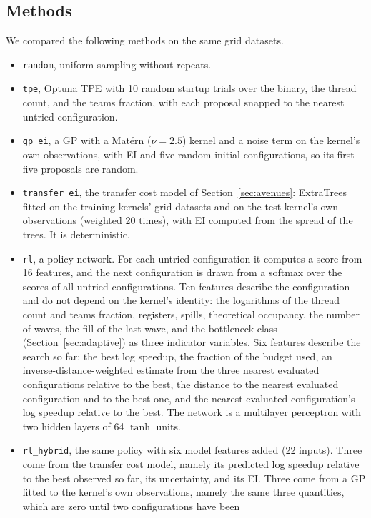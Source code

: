 \documentclass[10pt]{article}
\newcommand{\code}[1]{\texttt{#1}}
\begin{document}
\subsection{Methods}
We compared the following methods on the same grid datasets.
\begin{itemize}
\item \code{random}, uniform sampling without repeats.
\item \code{tpe}, Optuna TPE with 10 random startup trials over the binary,
  the thread count, and the teams fraction, with each proposal snapped to the
  nearest untried configuration.
\item \code{gp\_ei}, a GP with a Mat\'ern ($\nu = 2.5$) kernel and a noise
  term on the kernel's own observations, with EI and five random initial
  configurations, so its first five proposals are random.
\item \code{transfer\_ei}, the transfer cost model of
  Section~\ref{sec:avenues}: ExtraTrees fitted on the training kernels'
  grid datasets and on the test kernel's own observations (weighted 20 times),
  with EI computed from the spread of the trees. It is deterministic.
\item \code{rl}, a policy network. For each untried configuration it computes
  a score from 16 features, and the next configuration is drawn from a
  softmax over the scores of all untried configurations. Ten features
  describe the configuration and do not depend on the kernel's identity: the
  logarithms of the thread count and teams fraction, registers, spills,
  theoretical occupancy, the number of waves, the fill of the last wave, and
  the bottleneck class (Section~\ref{sec:adaptive}) as three indicator
  variables. Six features describe the search so far: the best log speedup,
  the fraction of the budget used, an inverse-distance-weighted estimate from
  the three nearest evaluated configurations relative to the best, the
  distance to the nearest evaluated configuration and to the best one, and
  the nearest evaluated configuration's log speedup relative to the best. The
  network is a multilayer perceptron with two hidden layers of 64
  $\tanh$ units.
\item \code{rl\_hybrid}, the same policy with six model features added (22
  inputs). Three come from the transfer cost model, namely its predicted log
  speedup relative to the best observed so far, its uncertainty, and its EI.
  Three come from a GP fitted to the kernel's own observations, namely the
  same three quantities, which are zero until two configurations have been

\end{itemize}
\end{document}

